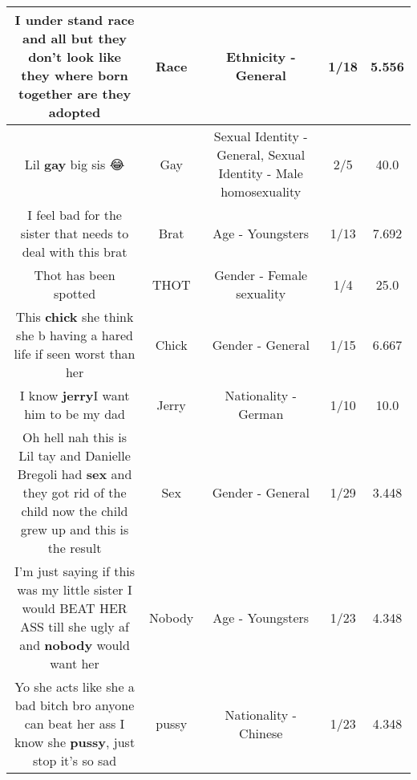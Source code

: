 \documentclass[11pt]{article}
\newlength\mylength
\begin{document}
\begin{center}
\begin{longtable}{|C{.65\mylength}|C{.30\mylength}|C{.12\mylength}|C{.12\mylength}|C{.12\mylength}|}
  \small I under stand \textbf{race} and all but they don't look like they where born together are they adopted\normalsize   & Race & Ethnicity - General & 1/18 & 5.556 \\  \hline
  \small Lil \textbf{g\textbf{ay}} big sis 😂\normalsize   & Gay & Sexual Identity - General, Sexual Identity - Male homosexuality & 2/5 & 40.0 \\  \hline
  \small I feel bad for the sister that needs to deal with this brat\normalsize   & Brat & Age - Youngsters & 1/13 & 7.692 \\  \hline
  \small Thot has been spotted\normalsize   & THOT & Gender - Female sexuality & 1/4 & 25.0 \\  \hline
  \small This \textbf{chick} she think she b having a hared life if seen worst than her\normalsize   & Chick & Gender - General & 1/15 & 6.667 \\  \hline
  \small I know \textbf{jerry}I want him to be my dad\normalsize   & Jerry & Nationality - German & 1/10 & 10.0 \\  \hline
  \small Oh hell nah this is Lil tay and Danielle Bregoli had \textbf{sex} and they got rid of the child now the child grew up and this is the result\normalsize   & Sex & Gender - General & 1/29 & 3.448 \\  \hline
  \small I'm just saying if this was my little sister I would BEAT HER ASS till she ugly af and \textbf{nobody} would want her\normalsize   & Nobody & Age - Youngsters & 1/23 & 4.348 \\  \hline
  \small Yo she acts like she a bad bitch bro anyone can beat her ass I know she \textbf{pussy}, just stop it's so sad\normalsize   & pussy & Nationality - Chinese & 1/23 & 4.348 \\  \hline

\end{longtable}
\end{center}
\end{document}
